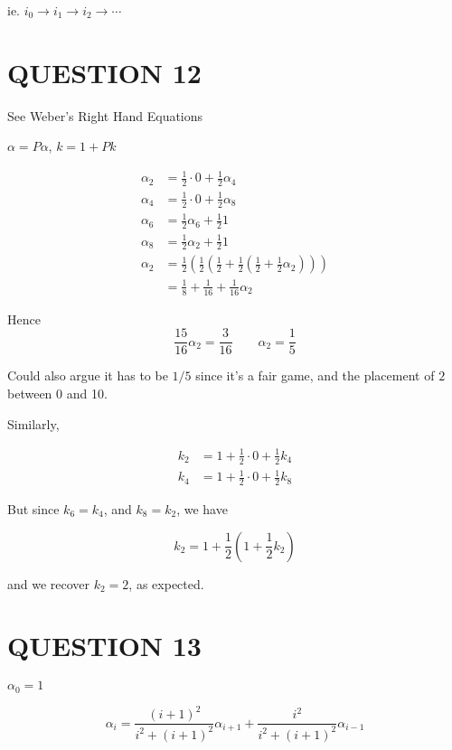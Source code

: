 \documentclass[a4paper]{article}
\begin{document}
ie. $ i_{0} \to i_{1} \to i_{2} \to \cdots $


\section{QUESTION 12}

See Weber's Right Hand Equations

$ \alpha = P \alpha $, $ k = 1 + P k $

\begin{align*}
\alpha_{2} & =  \frac{1}{2} \cdot 0 + \frac{1}{2} \alpha_{4}  \\
\alpha_{4} & =  \frac{1}{2} \cdot 0 + \frac{1}{2} \alpha_{8}  \\
\alpha_{6} & =  \frac{1}{2} \alpha_{6} + \frac{1}{2} 1  \\
\alpha_{8} & =  \frac{1}{2} \alpha_{2} + \frac{1}{2} 1  \\
\alpha_{2} & =  \frac{1}{2}\left(   \frac{1}{2} \left(  \frac{1}{2} + \frac{1}{2} \left(    \frac{1}{2} + \frac{1}{2} \alpha_{2} \right)   \right)  \right)   \\
& = \frac{1}{8} + \frac{1}{16} + \frac{1}{16} \alpha_{2}
\end{align*}

Hence \[ \frac{15}{16} \alpha_{2} = \frac{3}{16} \qquad \alpha_{2} = \frac{1}{5}  \]

Could also argue it has to be $ 1/5 $ since it's a fair game, and the placement of $ 2 $ between 0 and 10.

Similarly, 

\begin{align*}
k_{2} & = 1 + \frac{1}{2} \cdot 0 + \frac{1}{2} k_{4} \\
k_{4} & = 1 + \frac{1}{2} \cdot 0 + \frac{1}{2} k_{8}
\end{align*}

But since $ k_{6} = k_{4} $, and $ k_{8} = k_{2} $, we have 

\[ k_{2} = 1 + \frac{1}{2} \left(  1 + \frac{1}{2} k_{2} \right)  \]

and we recover $ k_{2} = 2 $, as expected. 

\section{QUESTION 13}


$ \alpha_{0} = 1 $

\[ \alpha_{i}  = \frac{(i+1)^{2}}{i^{2}  + (i + 1)^{2} } \alpha_{i+1} + \frac{i^{2}}{i^{2}  + (i + 1)^{2}  } \alpha_{i-1}   \]
\end{document}
